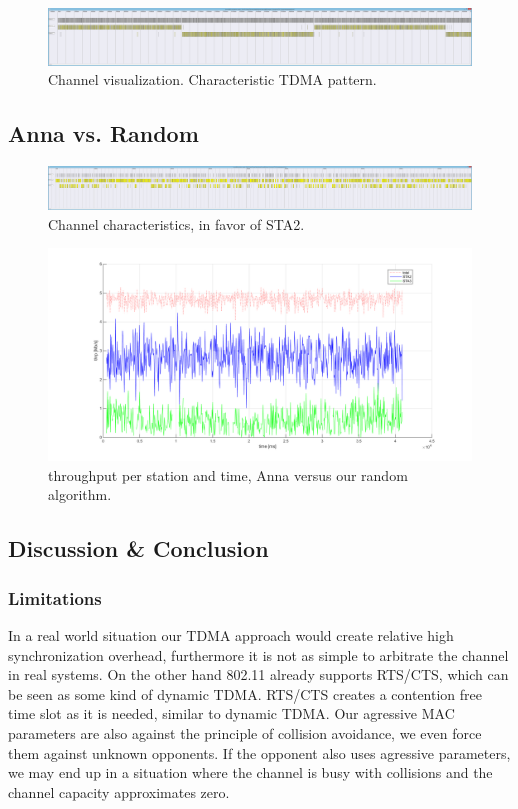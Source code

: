 \documentclass[12pt]{article}
\begin{document}
\begin{figure}[h!]
\centering
\includegraphics[width=\textwidth]{img/Anna_vs_Anna_TDMA.png}
\caption{Channel visualization. Characteristic TDMA pattern. \label{fig:aa}}
\end{figure}

\subsection{Anna vs. Random}

\begin{figure}[h!]
\centering
\includegraphics[width=\textwidth]{img/annaVSrandom.png}
\caption{Channel characteristics, in favor of STA2.  \label{fig:aa}}
\end{figure}

\begin{figure}[h!]
\centering
\includegraphics[width=\textwidth]{img/annaVSrandom_thrp.png}
\caption{throughput per station and time, Anna versus our random algorithm. \label{fig:aa}}
\end{figure}

\subsection{Discussion \& Conclusion}

\subsubsection{Limitations}
In a real world situation our TDMA approach would create relative high synchronization overhead, furthermore it is not as simple to arbitrate the channel in real systems. On the other hand 802.11 already supports RTS/CTS, which can be seen as some kind of dynamic TDMA. RTS/CTS creates a contention free time slot as it is needed, similar to dynamic TDMA. Our agressive MAC parameters are also against the principle of collision avoidance, we even force them against unknown opponents. If the opponent also uses agressive parameters, we may end up in a situation where the channel is busy with collisions and the channel capacity approximates zero.
\end{document}
